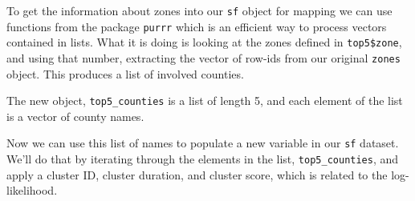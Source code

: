 \documentclass[
]{book}
\newenvironment{Shaded}{\begin{snugshade}}{\end{snugshade}}
\newcommand{\AttributeTok}[1]{\textcolor[rgb]{0.13,0.29,0.53}{#1}}
\newcommand{\CommentTok}[1]{\textcolor[rgb]{0.56,0.35,0.01}{\textit{#1}}}
\newcommand{\ControlFlowTok}[1]{\textcolor[rgb]{0.13,0.29,0.53}{\textbf{#1}}}
\newcommand{\DecValTok}[1]{\textcolor[rgb]{0.00,0.00,0.81}{#1}}
\newcommand{\DocumentationTok}[1]{\textcolor[rgb]{0.56,0.35,0.01}{\textbf{\textit{#1}}}}
\newcommand{\FunctionTok}[1]{\textcolor[rgb]{0.13,0.29,0.53}{\textbf{#1}}}
\newcommand{\NormalTok}[1]{#1}
\newcommand{\OtherTok}[1]{\textcolor[rgb]{0.56,0.35,0.01}{#1}}
\newcommand{\SpecialCharTok}[1]{\textcolor[rgb]{0.81,0.36,0.00}{\textbf{#1}}}
\begin{document}
To get the information about zones into our \texttt{sf} object for mapping we can use functions from the package \texttt{purrr} which is an efficient way to process vectors contained in lists. What it is doing is looking at the zones defined in \texttt{top5\$zone}, and using that number, extracting the vector of row-ids from our original \texttt{zones} object. This produces a list of involved counties.

\begin{Shaded}
\end{Shaded}

The new object, \texttt{top5\_counties} is a list of length 5, and each element of the list is a vector of county names.

Now we can use this list of names to populate a new variable in our \texttt{sf} dataset. We'll do that by iterating through the elements in the list, \texttt{top5\_counties}, and apply a cluster ID, cluster duration, and cluster score, which is related to the log-likelihood.

\begin{Shaded}
\end{Shaded}
\end{document}
